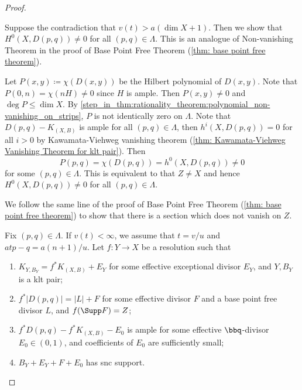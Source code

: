 \begin{proof}

        \begin{step}\label{step_in_thm:rationality_theorem:non-vanishing_on_strips}
            Suppose the contradiction that \(v(t) > a(\dim X + 1)\).
            Then we show that \(H^0(X,D(p,q)) \neq 0\) for all \((p,q) \in \Lambda\).
            This is an analogue of Non-vanishing Theorem in the proof of Base Point Free Theorem (\cref{thm: base point free theorem}).
        \end{step}
        Let \(P(x,y)\coloneqq \chi(D(x,y))\) be the Hilbert polynomial of \(D(x,y)\).
        Note that \(P(0,n) = \chi(nH) \neq 0\) since \(H\) is ample.
        Then \(P(x,y) \neq 0\) and \(\deg P \leq \dim X\).
        By \cref{step_in_thm:rationality_theorem:polynomial_non-vanishing_on_strips}, \(P\) is not identically zero on \(\Lambda\).
        Note that \(D(p,q) - K_{(X,B)}\) is ample for all \((p,q) \in \Lambda\), then \(h^i(X,D(p,q)) = 0\) for all \(i > 0\) by Kawamata-Viehweg vanishing theorem (\cref{thm: Kawamata-Viehweg Vanishing Theorem for klt pair}).
        Then 
        \[ P(p,q) = \chi(D(p,q)) = h^0(X,D(p,q)) \neq 0 \]
        for some \((p,q) \in \Lambda\).
        This is equivalent to that \(Z \neq X\) and hence \(H^0(X,D(p,q)) \neq 0\) for all \((p,q) \in \Lambda\).


        \begin{step}
            We follow the same line of the proof of Base Point Free Theorem (\cref{thm: base point free theorem}) to show that there is a section which does not vanish on \(Z\).
        \end{step}
        Fix \((p,q) \in \Lambda\).
        If \(v(t) < \infty\), we assume that \(t=v/u\) and \(atp-q = a(n+1)/u\).
        Let \(f:Y \to X\) be a resolution such that 
        \begin{enumerate}
            \item \(K_{Y,B_Y} = f^*K_{(X,B)} + E_Y\) for some effective exceptional divisor \(E_Y\), and \(Y,B_Y\) is a klt pair;
            \item \(f^*|D(p,q)| = |L| + F\) for some effective divisor \(F\) and a base point free divisor \(L\), and \(f(\Supp F) = Z\);
            \item \(f^*D(p,q) - f^*K_{(X,B)} - E_0\) is ample for some effective \(\bbq\)-divisor \(E_0 \in (0,1)\), and coefficients of \(E_0\) are sufficiently small;
            \item \(B_Y + E_Y + F + E_0\) has snc support.
        \end{enumerate}


\end{proof}
